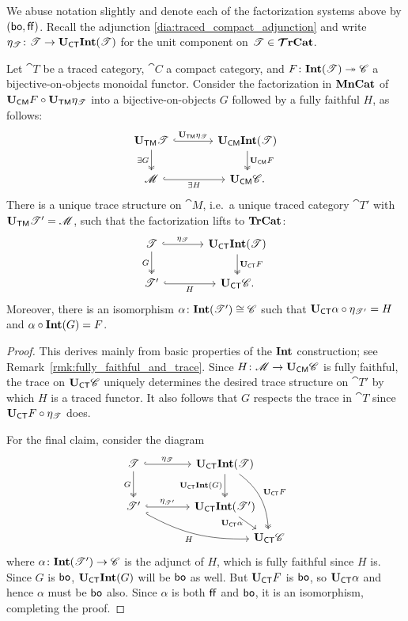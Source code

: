 \documentclass[11pt,oneside,article]{memoir}
\begin{document}
We abuse notation slightly and denote each of the factorization systems above by $(\mathsf{bo},\mathsf{ff})$. Recall
the adjunction \eqref{dia:traced_compact_adjunction} and write
$\eta_{\mathscr{T}}\colon\mathscr{T}\to\mathbf{U}_{\mathsf{CT}}\mathbf{Int}(\mathscr{T})$ for the unit component on $\mathscr{T}\in\bm{\mathcal{T}}\mathbf{rCat}$.

\begin{lemma}
    \label{lem:Tr_bo_Int}
  Let $\cat{T}$ be a traced category, $\cat{C}$ a compact category, and
  $F\colon\mathbf{Int}(\mathscr{T})\twoheadrightarrow \mathscr{C}$ a bijective-on-objects monoidal functor. Consider
  the factorization in $\mathbf{MnCat}$ of $\mathbf{U}_{\mathsf{CM}} F\circ\mathbf{U}_{\mathsf{TM}}\eta_{\mathscr{T}}$ into a bijective-on-objects $G$
  followed by a fully faithful $H$, as follows:
  \[ \begin{tikzcd}[column sep=large]
    \UTM \cat{T} \ar[r,hook,"\UTM\eta_{\cat{T}}"] \ar[d,two heads,"\exists G"']
      & \UCM\Int(\cat{T}) \ar[d,two heads,"\UCM F"] \\
    \cat{M} \ar[r,hook,"\exists H"'] & \UCM \cat{C}.
  \end{tikzcd} \]
  There is a unique trace structure on $\cat{M}$, i.e.\ a unique traced category $\cat{T}'$ with
  $\mathbf{U}_{\mathsf{TM}} \mathscr{T}'=\mathscr{M}$, such that the factorization lifts to $\mathbf{TrCat}$:
  \[ \begin{tikzcd}[column sep=large]
    \cat{T} \ar[r,hook,"\eta_{\cat{T}}"] \ar[d,two heads,"G"']
      & \UCT\Int(\cat{T}) \ar[d,two heads,"\UCT F"] \\
    \cat{T}' \ar[r,hook,"H"'] & \UCT \cat{C}.
  \end{tikzcd} \]
  Moreover, there is an isomorphism $\alpha\colon\mathbf{Int}(\mathscr{T}')\cong \mathscr{C}$ such that
  $\mathbf{U}_{\mathsf{CT}}\alpha\circ \eta_{\mathscr{T}'}=H$ and $\alpha\circ\mathbf{Int}(G)=F$.
\end{lemma}
\begin{proof}
  This derives mainly from basic properties of the $\mathbf{Int}$ construction; see
  Remark~\ref{rmk:fully_faithful_and_trace}. Since $H\colon\mathscr{M}\to\mathbf{U}_{\mathsf{CM}}\mathscr{C}$ is fully faithful,
  the trace on $\mathbf{U}_{\mathsf{CT}}\mathscr{C}$ uniquely determines the desired trace structure on $\cat{T}'$ by which
  $H$ is a traced functor. It also follows that $G$ respects the trace in $\cat{T}$ since $\mathbf{U}_{\mathsf{CT}}
  F\circ\eta_{\mathscr{T}}$ does.

  For the final claim, consider the diagram
  \[ \begin{tikzcd}[column sep=4em, row sep=5ex]
    \cat{T} \ar[r,hook,"\eta_{\cat{T}}"] \ar[d,two heads,"G"']
      & \UCT\Int(\cat{T}) \ar[d,two heads,"\UCT\Int(G)"']
        \ar[ddr,two heads,bend left=25,"\UCT F"] &[between origins] \\
    \cat{T}' \ar[r,hook,"\eta_{\cat{T}'}"] \ar[drr,hook,bend right=15,"H"']
      & \UCT\Int(\cat{T}') \ar[dr,"\UCT\alpha"' {inner sep=0pt,pos=.25}] & \\[-10]
      &&\UCT \cat{C}
  \end{tikzcd} \]
  where $\alpha\colon\mathbf{Int}(\mathscr{T}')\to \mathscr{C}$ is the adjunct of $H$, which is fully faithful since
  $H$ is. Since $G$ is $\mathsf{bo}$, $\mathbf{U}_{\mathsf{CT}}\mathbf{Int}(G)$ will be $\mathsf{bo}$ as well. But $\mathbf{U}_{\mathsf{CT}} F$ is $\mathsf{bo}$, so $\mathbf{U}_{\mathsf{CT}}
  \alpha$ and hence $\alpha$ must be $\mathsf{bo}$ also. Since $\alpha$ is both $\mathsf{ff}$ and $\mathsf{bo}$, it is an
  isomorphism, completing the proof.
\end{proof}
\end{document}
